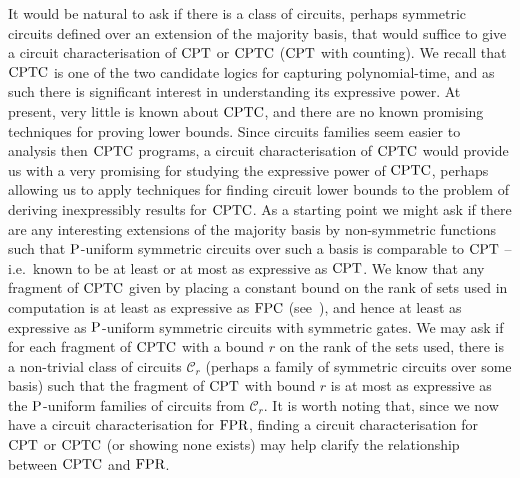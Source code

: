 \documentclass[../paper.tex]{subfiles}
\begin{document}
It would be natural to ask if there is a class of circuits, perhaps symmetric
circuits defined over an extension of the majority basis, that would suffice to
give a circuit characterisation of $\text{\upshape CPT}$ or $\text{\upshape CPTC}$ ($\text{\upshape CPT}$ with counting). We
recall that $\text{\upshape CPTC}$ is one of the two candidate logics for capturing
polynomial-time, and as such there is significant interest in understanding its
expressive power. At present, very little is known about $\text{\upshape CPTC}$, and there are
no known promising techniques for proving lower bounds. Since circuits families
seem easier to analysis then $\text{\upshape CPTC}$ programs, a circuit characterisation of
$\text{\upshape CPTC}$ would provide us with a very promising for studying the expressive power
of $\text{\upshape CPTC}$, perhaps allowing us to apply techniques for finding circuit lower
bounds to the problem of deriving inexpressibly results for $\text{\upshape CPTC}$. As a
starting point we might ask if there are any interesting extensions of the
majority basis by non-symmetric functions such that $\mathrm{P}$-uniform symmetric
circuits over such a basis is comparable to $\text{\upshape CPT}$ -- i.e.\ known to be at least
or at most as expressive as $\text{\upshape CPT}$. We know that any fragment of $\text{\upshape CPTC}$ given
by placing a constant bound on the rank of sets used in computation is at least
as expressive as $\text{\upshape FPC}$ (see~\cite{}), and hence at least as expressive as
$\mathrm{P}$-uniform symmetric circuits with symmetric gates. We may ask if for each
fragment of $\text{\upshape CPTC}$ with a bound $r$ on the rank of the sets used, there is a
non-trivial class of circuits $\mathcal{C}_r$ (perhaps a family of symmetric
circuits over some basis) such that the fragment of $\text{\upshape CPT}$ with bound $r$ is at
most as expressive as the $\mathrm{P}$-uniform families of circuits from
$\mathcal{C}_r$. It is worth noting that, since we now have a circuit
characterisation for $\text{\upshape FPR}$, finding a circuit characterisation for $\text{\upshape CPT}$ or
$\text{\upshape CPTC}$ (or showing none exists) may help clarify the relationship between
$\text{\upshape CPTC}$ and $\text{\upshape FPR}$.
\end{document}
